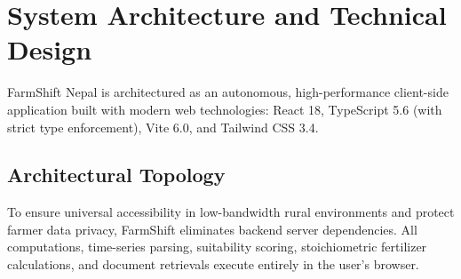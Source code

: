 \documentclass[11pt,a4paper]{report}
\begin{document}
\chapter{System Architecture and Technical Design}

FarmShift Nepal is architectured as an autonomous, high-performance client-side application built with modern web technologies: React 18, TypeScript 5.6 (with strict type enforcement), Vite 6.0, and Tailwind CSS 3.4.

\section{Architectural Topology}
To ensure universal accessibility in low-bandwidth rural environments and protect farmer data privacy, FarmShift eliminates backend server dependencies. All computations, time-series parsing, suitability scoring, stoichiometric fertilizer calculations, and document retrievals execute entirely in the user's browser.
\end{document}
